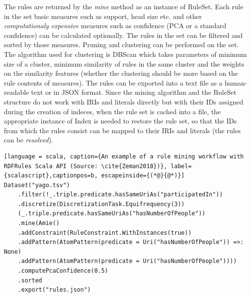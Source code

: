 The rules are returned by the \textit{mine} method as an instance of RuleSet. Each rule in the set basic measures such as support, head size etc. and other \textit{computationaly expensive} measures such as confidence (PCA or a standard confidence) can be calculated optionally. The rules in the set can be filtered and sorted by those measures. Pruning and clustering can be performed on the set. The algorithm used for clustering is DBScan which takes parameters of minimum size of a cluster, minimum similarity of rules in the same cluster and the weights on the similarity features (whether the clustering should be more based on the rule contents of measures). The rules can be exported into a text file as a human-readable text or in JSON format. Since the mining algorithm and the RuleSet structure do not work with IRIs and literals directly but with their IDs assigned during the creation of indeces, when the rule set is cached into a file, the appropriate instance of Index is needed to restore the rule set, so that the IDs from which the rules consist can be mapped to their IRIs and literals (the rules can be \textit{resolved}).

\begin{lstlisting}[language = scala, caption={An example of a rule mining workflow with RDFRules Scala API (Source: \cite{Zeman2018})}, label={scalascript},captionpos=b, escapeinside={(*@}{@*)}]
Dataset("yago.tsv")
    .filter(!_.triple.predicate.hasSameUriAs("participatedIn"))
    .discretize(DiscretizationTask.Equifrequency(3))
    (_.triple.predicate.hasSameUriAs("hasNumberOfPeople"))
    .mine(Amie()
    .addConstraint(RuleConstraint.WithInstances(true))
    .addPattern(AtomPattern(predicate = Uri("hasNumberOfPeople")) =>: None)
    .addPattern(AtomPattern(predicate = Uri("hasNumberOfPeople"))))
    .computePcaConfidence(0.5)
    .sorted
    .export("rules.json")
\end{lstlisting}
